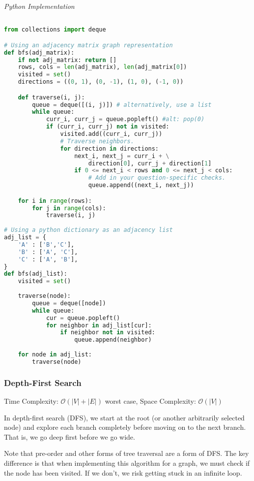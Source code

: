 \documentclass{article}
\newcommand{\bigO}{\mathcal{O}}
\begin{document}
\vspace{8pt} \emph{Python Implementation}
\begin{lstlisting}[language=Python]

from collections import deque

# Using an adjacency matrix graph representation
def bfs(adj_matrix):
    if not adj_matrix: return []
    rows, cols = len(adj_matrix), len(adj_matrix[0])
    visited = set()
    directions = ((0, 1), (0, -1), (1, 0), (-1, 0))

    def traverse(i, j):
        queue = deque([(i, j)]) # alternatively, use a list
        while queue:
            curr_i, curr_j = queue.popleft() #alt: pop(0)
            if (curr_i, curr_j) not in visited:
                visited.add((curr_i, curr_j))
                # Traverse neighbors.
                for direction in directions:
                    next_i, next_j = curr_i + \
                        direction[0], curr_j + direction[1]
                    if 0 <= next_i < rows and 0 <= next_j < cols:
                        # Add in your question-specific checks.
                        queue.append((next_i, next_j))

    for i in range(rows):
        for j in range(cols):
            traverse(i, j)
            
# Using a python dictionary as an adjacency list
adj_list = {
    'A' : ['B','C'],
    'B' : ['A', 'C'],
    'C' : ['A', 'B'],
}
def bfs(adj_list):
    visited = set()
    
    traverse(node):
        queue = deque([node])
        while queue:
            cur = queue.popleft()
            for neighbor in adj_list[cur]:
                if neighbor not in visited:
                    queue.append(neighbor)
                    
    for node in adj_list:
        traverse(node)
\end{lstlisting}

    \subsubsection{Depth-First Search }
    Time Complexity: $\bigO(|V| + |E|)$ worst case, Space Complexity: $\bigO(|V|)$
    
    In depth-first search (DFS), we start at the root (or another arbitrarily selected node) and explore each branch completely before moving on to the next branch. That is, we go deep first before we go wide. 
    
    Note that pre-order and other forms of tree traversal are a form of DFS. The key difference is that when implementing this algorithm for a graph, we must check if the node has been visited. If we don't, we risk getting stuck in an infinite loop. 
    
\end{document}
